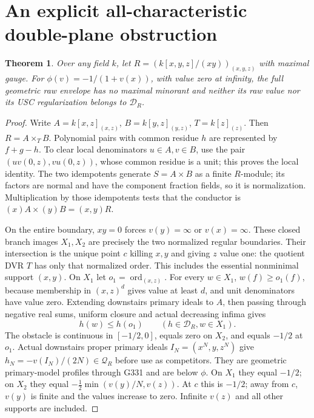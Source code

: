 \documentclass[11pt]{article}
\newtheorem{theorem}{Theorem}
\newcommand{\D}{\mathcal D}
\newcommand{\Q}{\mathcal Q}
\begin{document}
\section{An explicit all-characteristic double-plane obstruction}
\begin{theorem}\label{double}
Over any field $k$, let $R=(k[x,y,z]/(xy))_{(x,y,z)}$ with maximal gauge.
For $\phi(v)=-1/(1+v(x))$, with value zero at infinity, the full geometric
raw envelope has no maximal minorant and neither its raw value nor its USC
regularization belongs to $\D_R$.
\end{theorem}
\begin{proof}
Write $A=k[x,z]_{(x,z)}$, $B=k[y,z]_{(y,z)}$, $T=k[z]_{(z)}$.
Then $R=A\times_T B$. Polynomial pairs with common residue $h$ are represented
by $f+g-h$. To clear local denominators $u\in A,v\in B$, use the pair
$(u v(0,z),v u(0,z))$, whose common residue is a unit; this proves the local
identity. The two idempotents generate $S=A\times B$ as a finite $R$-module;
its factors are normal and have the component fraction fields, so it is
normalization. Multiplication by those idempotents tests that the conductor
is $(x)A\times(y)B=(x,y)R$.

On the entire boundary, $xy=0$ forces $v(y)=\infty$ or $v(x)=\infty$.
These closed branch images $X_1,X_2$ are precisely the two normalized regular
boundaries. Their intersection is the unique point $c$ killing $x,y$ and
giving $z$ value one: the quotient DVR $T$ has only that normalized order.
This includes the essential nonminimal support $(x,y)$.
On $X_1$ let $o_1=\operatorname{ord}_{(x,z)}$.
For every $w\in X_1$, $w(f)\ge o_1(f)$, because membership in $(x,z)^d$
gives value at least $d$, and unit denominators have value zero.
Extending downstairs primary ideals to $A$, then passing through negative
real sums, uniform closure and actual decreasing infima gives
\[
 h(w)\le h(o_1)\qquad(h\in\D_R, w\in X_1).
\]
The obstacle is continuous in $[-1/2,0]$, equals zero on $X_2$, and equals
$-1/2$ at $o_1$.
Actual downstairs proper primary ideals $I_N=(x^N,y,z^N)$ give
$h_N=-v(I_N)/(2N)\in\Q_R$ before use as competitors. They are geometric
primary-model profiles through G331 and are below $\phi$. On $X_1$ they
equal $-1/2$; on $X_2$ they equal
$-\tfrac12\min(v(y)/N,v(z))$. At $c$ this is $-1/2$; away from $c$, $v(y)$
is finite and the values increase to zero. Infinite $v(z)$ and all other
supports are included.


\end{proof}
\end{document}
